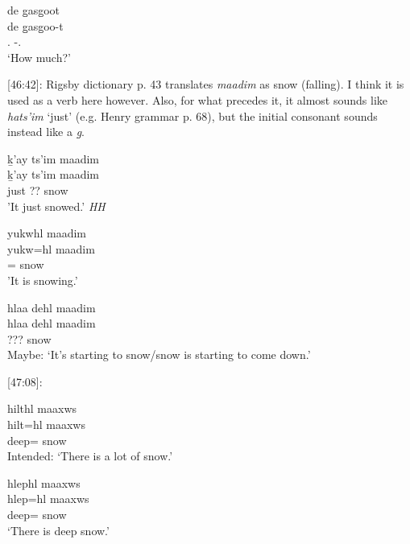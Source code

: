 \begin{exe}
    \ex \glll de g̱asg̱oot  \\
    de g̱asg̱oo-t  \\
    \Wh{}.\Spt{} \Mass{}-\Tsg{}.\Ii{}  \\
    `How much?'
\end{exe}

[46:42]: Rigsby dictionary p. 43 translates \textit{maadim} as snow (falling). I think it is used as a verb here however. Also, for what precedes it, it almost sounds like \textit{hats'im} `just' (e.g. Henry grammar p. 68), but the initial consonant sounds instead like a \textit{g̱}.

\begin{exe}
    \ex 
    \begin{xlist}
    \item \glll ḵ'ay ts'im maadim  \\
    ḵ'ay ts'im maadim \\
    just ?? snow  \\
    'It just snowed.' \textit{HH}
    \item \glll yukwhl maadim  \\
    yukw=hl maadim \\
    \Prog{}=\Cn{} snow  \\
    'It is snowing.'
     \item \glll hlaa dehl maadim  \\
    hlaa dehl maadim  \\
    \Incep{} ??? snow  \\
    Maybe: `It's starting to snow/snow is starting to come down.' 
    \end{xlist}
\end{exe}

[47:08]:

\begin{exe}
    \ex
    \begin{xlist}
    \item \glll * hilthl maaxws \\
    {} hilt=hl maaxws   \\
    {} deep=\Cn{} snow  \\
    Intended: `There is a lot of snow.'
    \item \glll hlephl maaxws \\
    hlep=hl maaxws   \\
    deep=\Cn{} snow  \\
    `There is deep snow.'
    \end{xlist}
\end{exe}

